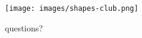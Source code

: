 \documentclass[include/preamble.tex]{subfiles}
\begin{document}

\begin{frame}
  \begin{figure}
    \begin{center}
      \texttt{[image: images/shapes-club.png]}
    \end{center}
    \caption{questions?}
  \end{figure}
\end{frame}
\end{document}
